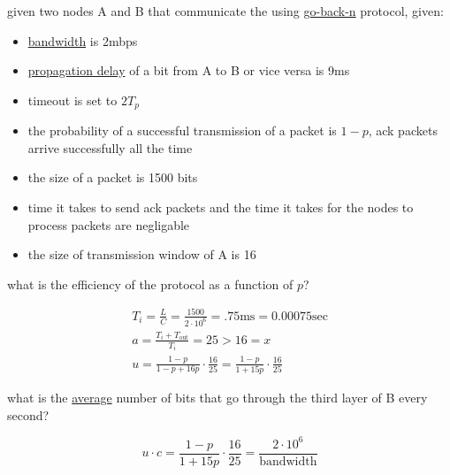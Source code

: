 \documentclass[a4paper,12pt]{article}
\begin{document}
\begin{question}
given two nodes A and B that communicate the using \hyperref[sec:org72dc15c]{go-back-n} protocol, given:\\
\begin{itemize}
\item \hyperref[sec:org1cd0eee]{bandwidth} is 2mbps\\
\item \hyperref[sec:org1724811]{propagation delay} of a bit from A to B or vice versa is 9ms\\
\item timeout is set to \(2T_p\)\\
\item the probability of a successful transmission of a packet is \(1-p\), ack packets arrive successfully all the time\\
\item the size of a packet is 1500 bits\\
\item time it takes to send ack packets and the time it takes for the nodes to process packets are negligable\\
\item the size of transmission window of A is 16\\
\end{itemize}

\begin{subquestion}
what is the efficiency of the protocol as a function of \(p\)?\\
\begin{answer}
\begin{gather*}
  T_i = \frac{L}{C} = \frac{1500}{2\cdot10^6} = .75\text{ms} = 0.00075\text{sec}\\
  a = \frac{T_i+T_\text{out}}{T_i} = 25 > 16 = x\\
  u = \frac{1-p}{1-p+16p} \cdot \frac{16}{25} = \frac{1-p}{1+15p} \cdot \frac{16}{25}
\end{gather*}
\end{answer}
\end{subquestion}

\begin{subquestion}
what is the \href{20220813152209-average.org}{average} number of bits that go through the third layer of B every second?\\
\begin{answer}
\[
u \cdot c = \frac{1-p}{1+15p} \cdot \frac{16}{25} = \frac{2\cdot10^6}{\text{bandwidth}}
\]\\
\end{answer}
\end{subquestion}


\end{question}
\end{document}
